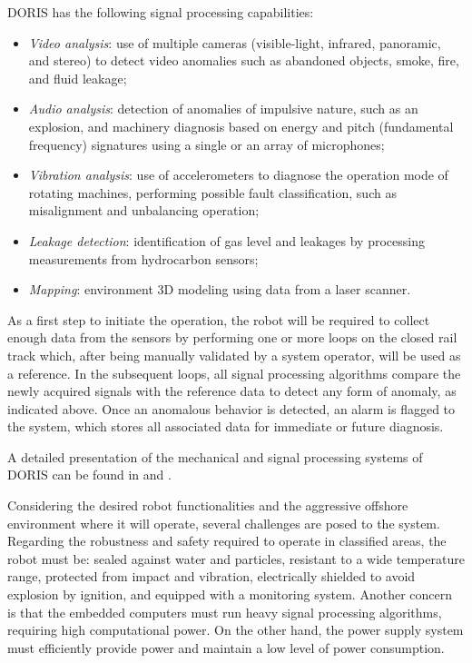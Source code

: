 \documentclass{ifacconf}
\begin{document}
DORIS has the following signal processing capabilities:
\begin{itemize}
\item \emph{Video analysis}: use of multiple cameras (visible-light, infrared,
panoramic, and stereo) to detect video anomalies such as abandoned objects, smoke, fire, and fluid leakage;
\item \emph{Audio analysis}: detection of anomalies of impulsive nature, such as
an explosion, and machinery diagnosis based on energy and pitch (fundamental
frequency) signatures using a single or an array of microphones;
\item \emph{Vibration analysis}: use of accelerometers to
diagnose the operation mode of rotating machines, performing possible fault
classification, such as misalignment and unbalancing operation;
\item \emph{Leakage detection}: identification of gas level and leakages by
processing measurements from hydrocarbon sensors;
\item \emph{Mapping}: environment 3D modeling using data from a laser
scanner.
\end{itemize}

As a first step to initiate the operation, the robot will be required to
collect enough data from the sensors by performing one or more loops on the
closed rail track which, after being manually validated by a system operator,
will be used as a reference. In the subsequent loops, all signal processing
algorithms compare the newly acquired signals with the reference data to detect
any form of anomaly, as indicated above. Once an anomalous behavior is
detected, an alarm is flagged to the system, which stores all associated data
for immediate or future diagnosis.

A detailed presentation of the mechanical and signal
processing systems of DORIS can be found in \cite{OTC} and \cite{cba}.

Considering the desired robot functionalities and the aggressive offshore
environment where it will operate, several challenges are posed to the system.
Regarding the robustness and safety required to operate in classified areas, the robot must be: sealed against water
and particles, resistant to a wide temperature range, protected from impact and
vibration, electrically shielded to avoid explosion by ignition, and equipped
with a monitoring system. Another concern is that the embedded computers must
run heavy signal processing algorithms, requiring high computational power. On
the other hand, the power supply system must efficiently provide power and
maintain a low level of power consumption. 
\end{document}
